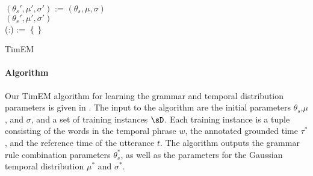 \begin{algorithm}
	$(\theta_s',\mu',\sigma')$ := $(\theta_s,\mu,\sigma)$ \\
	\KwRet $(\theta_s',\mu',\sigma')$ \\
	\Begin(:){
		\sH := $\left\{\right\}$ \\
		\Return{\sH}
	}

	\caption{
		\label{alg:pseudocode}
		TimEM 
	}
\end{algorithm}

\paragraph{Algorithm}
Our TimEM algorithm for learning the grammar and temporal distribution 
	parameters is given in .
The input to the algorithm are the initial parameters $\theta_s$,$\mu$, and
	$\sigma$, and a set of training instances $\sD$.
Each training instance is a tuple consisting of the words in the temporal
	phrase $w$, the annotated grounded time $\tau^*$, and the reference time
	of the utterance $t$.
The algorithm outputs the grammar rule combination parameters $\theta_s^*$,
	as well as the parameters for the Gaussian temporal distribution
	$\mu^*$ and $\sigma^*$.

